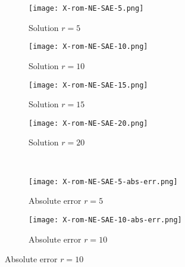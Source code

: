 \begin{figure}[!htb]
     \begin{center}
        \begin{subfigure}[b]{0.23\textwidth}
          \begin{center}
            \texttt{[image: X-rom-NE-SAE-5.png]}
          \end{center}
            \caption{Solution $r = 5$}
        \end{subfigure}
   \begin{subfigure}[b]{0.23\textwidth}
       \begin{center}
        \texttt{[image: X-rom-NE-SAE-10.png]}
       \end{center}
            \caption{Solution $r = 10$}
        \end{subfigure}
   \begin{subfigure}[b]{0.23\textwidth}
            \begin{center}
                \texttt{[image: X-rom-NE-SAE-15.png]}
            \end{center}
            \caption{Solution $r = 15$}
        \end{subfigure}
   \begin{subfigure}[b]{0.23\textwidth}
            \begin{center}
                \texttt{[image: X-rom-NE-SAE-20.png]}
            \end{center}
            \caption{Solution $r = 20$}
        \end{subfigure}\\  
        \begin{subfigure}[b]{0.23\textwidth}
            \begin{center}
                \texttt{[image: X-rom-NE-SAE-5-abs-err.png]}
            \end{center}
            \caption{Absolute error $r = 5$}
        \end{subfigure}  
        \begin{subfigure}[b]{0.23\textwidth}
            \begin{center}
                \texttt{[image: X-rom-NE-SAE-10-abs-err.png]}
            \end{center}
            \caption{Absolute error $r = 10$}

\end{subfigure}
\end{center}
\end{figure}
